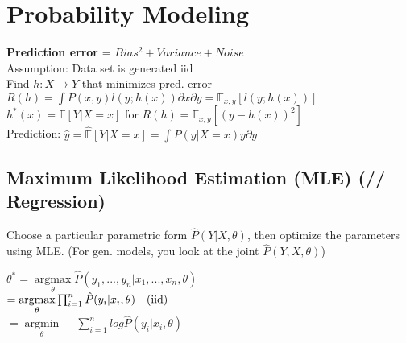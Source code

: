 \section*{Probability Modeling}
\textbf{Prediction error} = $Bias^2 + Variance + Noise$\\
Assumption: Data set is generated iid\\
Find $h:X\rightarrow Y$ that minimizes pred. error $R(h) = \int P(x,y)l(y;h(x)) \partial x \partial y = \mathbb{E}_{x,y}[l(y;h(x))]$\\
$h^*(x) = \mathbb{E}[Y|X=x]$ for $R(h) = \mathbb{E}_{x,y}[(y-h(x))^2]$\\
Prediction: $\hat{y} = \hat{\mathbb{E}}[Y|X=x] = \int \hat{P}(y|X=x)y\partial y$

\subsection*{Maximum Likelihood Estimation (MLE) (// Regression)}
Choose a particular parametric form $\hat{P}(Y|X,\theta)$, then optimize the parameters using MLE. (For gen. models, you look at the joint  $\hat{P}(Y,X,\theta)$)

$\theta^* = \underset{\theta}{\operatorname{argmax}} \hat{P}(y_1,...,y_n|x_1,...,x_n,\theta) $\\
$= \underset{\theta}{\operatorname{argmax}} \prod_{i=1}^n \hat{P}(y_i|x_i, \theta) \text{\quad (iid)}$\\
$= \underset{\theta}{\operatorname{argmin}} - \sum_{i=1}^n log \hat{P}(y_i|x_i,\theta)$\\



